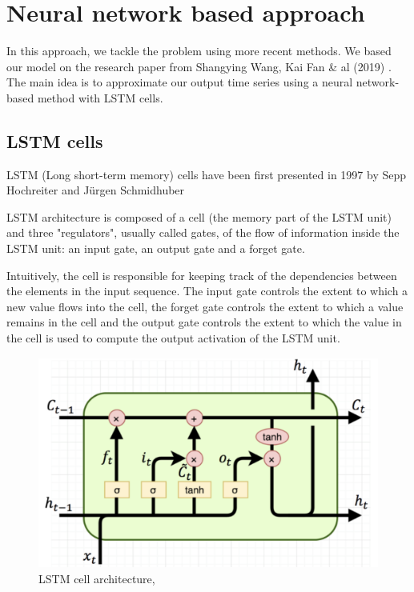 \documentclass{article}
\begin{document}
\section{Neural network based approach}

In this approach, we tackle the problem using more recent methods. We based our model on the research paper from Shangying Wang, Kai Fan & al (2019) \cite{emulation_using_NN}. The main idea is to approximate our output time series using a neural network-based method with LSTM cells.

\subsection{LSTM cells}

LSTM (Long short-term memory) cells have been first presented in 1997 by Sepp Hochreiter and Jürgen Schmidhuber \cite{Long_short_term_memory}

LSTM architecture is composed of a cell (the memory part of the LSTM unit) and three "regulators", usually called gates, of the flow of information inside the LSTM unit: an input gate, an output gate and a forget gate. 

Intuitively, the cell is responsible for keeping track of the dependencies between the elements in the input sequence. The input gate controls the extent to which a new value flows into the cell, the forget gate controls the extent to which a value remains in the cell and the output gate controls the extent to which the value in the cell is used to compute the output activation of the LSTM unit.

\begin{figure}[H]
\centering
\includegraphics[scale=0.4]{image/lstm_cell.png}
\caption{LSTM cell architecture,}
\label{fig: lstm_cell}
\end{figure}
\\  
  
\end{document}
